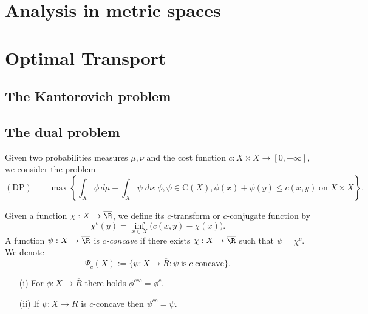 
\section{Analysis in metric spaces}


\section{Optimal Transport}
\subsection{The Kantorovich problem}
\begin{defn}

\end{defn}

\subsection{The dual problem}
\begin{defn} Given two probabilities measures $\mu, \nu$ and the cost function $c:X\times X\to [0,+\infty]$, we consider the problem
\begin{equation*}
    \mathrm{(DP)}\qquad
     \max \left\lbrace \int_X \phi\,d\mu + \int_X\psi\;d\nu: \phi,\psi\in \mathrm{C}(X), \phi(x)+\psi(y)\leq c(x,y)\;\text{on}\;X\times X \right\rbrace.
\end{equation*}

\end{defn}
\begin{defn} Given a function $\chi:X\to \overline{\R}$, we define its $c$-transform or $c$-conjugate function by
\begin{equation*}
    \chi^c(y) = \inf_{x\in X} \Big(c(x,y) - \chi(x)\Big).
\end{equation*}
A function $\psi:X\to \overline{\R}$ is \emph{$c$-concave} if there exists $\chi:X\to \overline{\R}$ such that $\psi=\chi^c$. We denote
\begin{equation*}
    \Psi_c(X):= \big\lbrace  \psi:X\to \overline{R}: \psi\;\text{is}\;c\;\text{concave}\big\rbrace.
\end{equation*}
\end{defn}

\begin{lem} \quad 
\begin{itemize}
    \item[(i)] For $\phi:X\to \overline{R}$ there holds $\phi^{ccc} = \phi^c$.
    \item[(ii)] If $\psi:X\to \overline{R}$ is $c$-concave then $\psi^{cc} = \psi$.
\end{itemize}
\end{lem}

\subsection{}